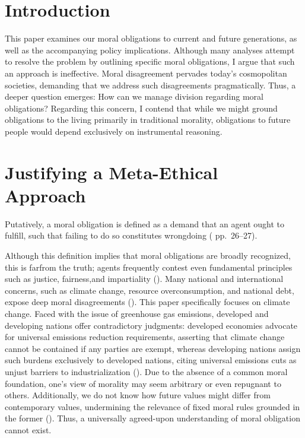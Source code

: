 \documentclass[12pt, a4paper, twoside]{article}
\begin{document}
\maketitle{}

\section{Introduction}

This paper examines our moral obligations to current and future generations, as well as the accompanying policy implications. Although many analyses attempt to resolve the problem by outlining specific moral obligations, I argue that such an approach is ineffective. Moral disagreement pervades today’s cosmopolitan societies, demanding that we address such disagreements pragmatically. Thus, a deeper question emerges: How can we manage division regarding moral obligations? Regarding this concern, I contend that while we might ground obligations to the living primarily in traditional morality, obligations to future people would depend exclusively on instrumental reasoning.

\section{Justifying a Meta-Ethical Approach}

Putatively, a moral obligation is defined as a demand that an agent ought to fulfill, such that failing to do so constitutes wrongdoing (\cite{pick2004} pp.\ 26–27).

Although this definition implies that moral obligations are broadly recognized, this is farfrom the truth; agents frequently contest even fundamental principles such as justice, fairness,and impartiality (\cite{atari2020}). Many national and international concerns, such as climate change, resource overconsumption, and national debt, expose deep moral disagreements (\cite{hasan2023}). This paper specifically
focuses on climate change. Faced with the issue of greenhouse gas emissions, developed and
developing nations offer contradictory judgments: developed economies advocate for universal emissions reduction requirements, asserting that climate change cannot be contained if any parties are exempt, whereas developing nations assign such burdens exclusively to developed nations, citing universal emissions cuts as unjust barriers to industrialization (\cite{belfiori2024}). Due to the absence of a common moral foundation, one’s view of morality may seem arbitrary or even repugnant to others. Additionally, we do not know how future values might differ from contemporary values,
undermining the relevance of fixed moral rules grounded in the former (\cite{macaskill2019}). Thus, a universally agreed-upon understanding of moral obligation cannot exist.
\end{document}
